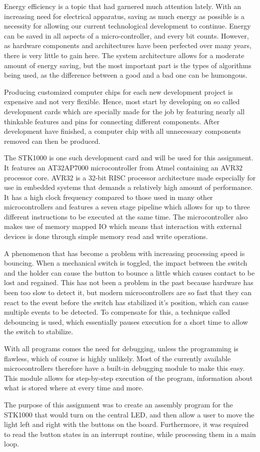 Energy efficiency is a topic that had garnered much attention lately. With an increasing need for electrical apparatus, saving as much energy as possible is a necessity for allowing our current technological development to continue. Energy can be saved in all aspects of a micro-controller, and every bit counts. However, as hardware components and architectures have been perfected over many years, there is very little to gain here. The system architecture allows for a moderate amount of energy saving, but the most important part is the types of algorithms being used, as the difference between a good and a bad one can be humongous.

Producing customized computer chips for each new development project is expensive and not very flexible. Hence, most start by developing on so called development cards which are specially made for the job by featuring nearly all thinkable features and pins for connecting different components. After development have finished, a computer chip with all unnecessary components removed can then be produced.

The STK1000 is one such development card and will be used for this assignment. It features an AT32AP7000 \cite{ap7000} microcontroller from Atmel containing an AVR32 \cite{avr32} processor core. AVR32 is a 32-bit RISC processor architecture made especially for use in embedded systems that demands a relatively high amount of performance. It has a high clock frequency compared to those used in many other microcontrollers and features a seven stage pipeline which allows for up to three different instructions to be executed at the same time. The microcontroller also makes use of memory mapped IO which means that interaction with external devices is done through simple memory read and write operations.

A phenomenon that has become a problem with increasing processing speed is bouncing. When a mechanical switch is toggled, the impact between the switch and the holder can cause the button to bounce a little which causes contact to be lost and regained. This has not been a problem in the past because hardware has been too slow to detect it, but modern microcontrollers are so fast that they can react to the event before the switch has stabilized it’s position, which can cause multiple events to be detected. To compensate for this, a technique called debouncing is used, which essentially pauses execution for a short time to allow the switch to stabilize.

With all programs comes the need for debugging, unless the programming is flawless, which of course is highly unlikely. Most of the currently available microcontrollers therefore have a built-in debugging module to make this easy. This module allows for step-by-step execution of the program, information about what is stored where at every time and more.

The purpose of this assignment was to create an assembly program for the STK1000 that would turn on the central LED, and then allow a user to move the light left and right with the buttons on the board. Furthermore, it was required to read the button states in an interrupt routine, while processing them in a main loop.
